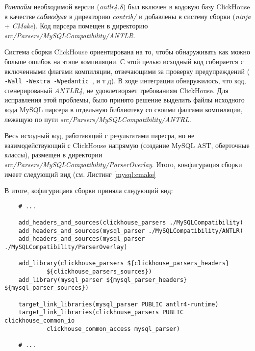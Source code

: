 \textit{Рантайм} необходимой версии (\textit{antlr4.8}) был включен в кодовую базу ClickHouse в качестве \textit{сабмодуля} в директорию \textit{contrib/} и добавлены в систему сборки (\textit{ninja} + \textit{CMake}). Код парсера помещен в директорию\\ \textit{src/Parsers/MySQLCompatibility/ANTLR}.

Система сборки ClickHouse ориентирована на то, чтобы обнаруживать как можно больше ошибок на этапе компиляции. С этой целью исходный код собирается с включенными флагами компиляции, отвечающими за проверку предупреждений (\texttt{ -Wall -Wextra -Wpedantic }, и т д). В ходе интеграции обнаружилось, что код, сгенерированый \textit{ANTLR4}, не удовлетворяет требованиям ClickHouse. Для исправления этой проблемы, было принято решение выделить файлы исходного кода MySQL парсера в отдельную библиотеку со своими фалгами компиляции, лежащую по пути \textit{src/Parsers/MySQLCompatibility/ANTRL}. 

Весь исходный код, работающий с результатами паресра, но не взаимодействующий с ClickHouse напрямую (создание MySQL AST, оберточные классы), размещен в директории \textit{src/Parsers/MySQLCompatibility/ParserOverlay}. Итого, конфигурация сборки имеет следующий вид (см. Листинг \ref{mysql:cmake}

В итоге, кофигурицаия сборки приняла следующий вид:
\begin{code}
    \label{mysql:cmake}
    \begin{verbatim}
    # ...

    add_headers_and_sources(clickhouse_parsers ./MySQLCompatibility)
    add_headers_and_sources(mysql_parser ./MySQLCompatibility/ANTLR)
    add_headers_and_sources(mysql_parser ./MySQLCompatibility/ParserOverlay)

    add_library(clickhouse_parsers ${clickhouse_parsers_headers}
            ${clickhouse_parsers_sources})
    add_library(mysql_parser ${mysql_parser_headers} ${mysql_parser_sources})

    target_link_libraries(mysql_parser PUBLIC antlr4-runtime)
    target_link_libraries(clickhouse_parsers PUBLIC clickhouse_common_io
            clickhouse_common_access mysql_parser)

    # ...
    \end{verbatim}
\end{code}

